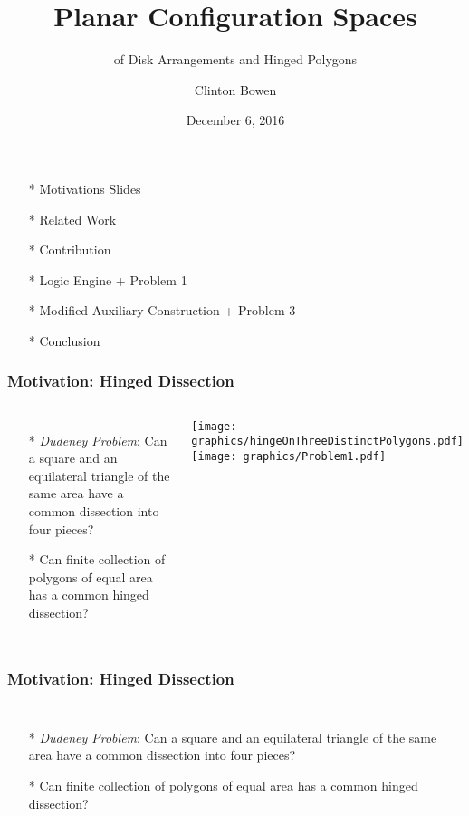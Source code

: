 \documentclass{beamer}
\title[Planar Configuration Spaces]{Planar Configuration Spaces }
\subtitle{of Disk Arrangements and Hinged Polygons}
\author{Clinton Bowen}
\institute
{
  Cal State Northridge
}
\date
{December 6, 2016}
\begin{document}
\frame{\titlepage}
\begin{frame}
\begin{itemize}
    \item[*] Motivations Slides
    \item[*] Related Work
    \item[*] Contribution
    \item[*] Logic Engine + Problem 1
    \item[*] Modified Auxiliary Construction + Problem 3
    \item[*] Conclusion
\end{itemize}
\end{frame}
\begin{frame}\frametitle{Motivation: Hinged Dissection}
    \begin{columns}[c]
        \begin{itemize}
            \item[*] \textit{Dudeney Problem}: Can a square and an equilateral triangle of the same area have a common dissection into four pieces?
            \item[*]  Can finite collection of polygons of equal area has a common hinged dissection?
        \end{itemize}
        \begin{minipage}{\linewidth}
            \begin{center}
            \texttt{[image: graphics/hingeOnThreeDistinctPolygons.pdf]}\label{gfx:hingeOnThreeDistinctPolygons.pdf}\vspace{.25in}
            \texttt{[image: graphics/Problem1.pdf]}
            \label{fig:problem1}
            \end{center}
        \end{minipage}
    \end{columns}
\end{frame}

\begin{frame}\frametitle{Motivation: Hinged Dissection}
    \begin{columns}[c]
        \begin{itemize}
            \item[*] \textit{Dudeney Problem}: Can a square and an equilateral triangle of the same area have a common dissection into four pieces?
            \item[*]  Can finite collection of polygons of equal area has a common hinged dissection?
        \end{itemize}
  \begin{minipage}{\linewidth}
    \begin{center}
    \end{center}
  \end{minipage}
  \end{columns}
\end{frame}
\end{document}
